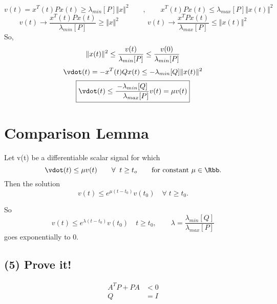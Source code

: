 \documentclass{article}
\begin{document}
\begin{equation}
  v(t) = x^T(t)Px(t) \ge \lambda_{min}[P] \Vert x\Vert^2\qquad ,\qquad
  x^T(t)Px(t) \le \lambda_{max}[P]\Vert x(t)\Vert^2 
\end{equation}
\begin{equation}
  v(t) \rightarrow \frac{x^T(t)Px(t)}{\lambda_{min}[P]} \ge \Vert x
  \Vert^2 \qquad \qquad v(t)\rightarrow
  \frac{x^TPx(t)}{\lambda_{max}[P]}\le 
  \Vert x(t)\Vert^2 
\end{equation}
So, 
\begin{equation}
  \lVert x(t)\rVert^2 \le \frac{v(t)}{\lambda_{min}[P]} \le
  \frac{v(0)}{\lambda_{min}[P]} 
\end{equation}
\begin{equation}
  \vdot (t) = -x^T(t)Qx(t) \le -\lambda_{min}[Q]\norm{x(t)}^2
\end{equation}
\begin{equation}
  \boxed{\vdot(t) \le \frac{-\lambda_{min}[Q]}{\quad\lambda_{max}[P]}v(t) =
    \mu v(t)}
\end{equation}

\section{Comparison Lemma}
Let v(t) be a differentiable scalar signal for which 
\begin{equation}
  \vdot(t) \le \mu v(t) \qquad \forall \;\; t \ge t_o \qquad\text{for
    constant } \mu \in \Rbb.
\end{equation}
Then the solution 
\begin{equation}
  v(t) \le e^{\mu(t-t_0)}v(t_0) \quad \forall \; t \ge t_0.
\end{equation}

So 
\begin{equation}
  v(t) \le e^{\lambda(t - t_0)}v(t_0) \quad t\ge t_0, \qquad \lambda =
    \frac{\lambda_{min}[Q]}{\lambda_{max}[P]} 
\end{equation}
goes exponentially to 0.

\subsection{(5) Prove it!}

\begin{equation}
  \begin{split}
    A^TP + P A &< 0\\
    Q &= I
  \end{split}
\end{equation}
\end{document}
